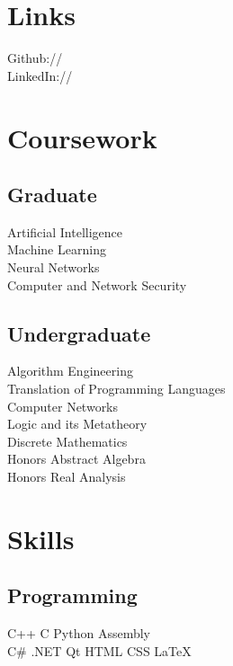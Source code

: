 \documentclass[]{deedy-resume-openfont}
\begin{document}
\begin{minipage}[t]{0.33\textwidth}
\section{Links} 
Github:// \href{https://github.com/rileyannis}{} \\
LinkedIn://  \href{https://www.linkedin.com/in/rileyannis}{} \\
\sectionsep


\section{Coursework}
\subsection{Graduate}
Artificial Intelligence\\
Machine Learning\\
Neural Networks\\
Computer and Network Security\\
\sectionsep

\subsection{Undergraduate}
Algorithm Engineering\\
Translation of Programming Languages\\
Computer Networks\\
Logic and its Metatheory\\
Discrete Mathematics\\
Honors Abstract Algebra\\
Honors Real Analysis\\
\sectionsep


\section{Skills}
\subsection{Programming}
C++ \textbullet{} C \textbullet{} Python \textbullet{} Assembly\\
C\# \textbullet{} .NET \textbullet{} Qt \textbullet{} HTML \textbullet{} CSS \textbullet{} \LaTeX\\
\sectionsep

\end{minipage}
\end{document}

